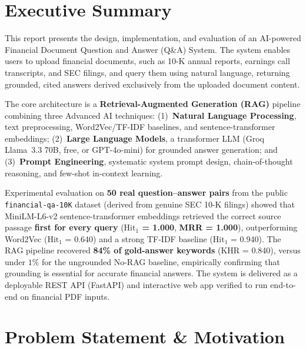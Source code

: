 \documentclass[12pt,a4paper]{article}
\begin{document}
\newpage
\tableofcontents
\newpage

\section{Executive Summary}

This report presents the design, implementation, and evaluation of an AI-powered Financial Document Question and Answer (Q\&A) System. The system enables users to upload financial documents, such as 10-K annual reports, earnings call transcripts, and SEC filings, and query them using natural language, returning grounded, cited answers derived exclusively from the uploaded document content.

The core architecture is a \textbf{Retrieval-Augmented Generation (RAG)} pipeline combining three Advanced AI techniques: (1)~\textbf{Natural Language Processing}, text preprocessing, Word2Vec/TF-IDF baselines, and sentence-transformer embeddings; (2)~\textbf{Large Language Models}, a transformer LLM (Groq Llama~3.3 70B, free, or GPT-4o-mini) for grounded answer generation; and (3)~\textbf{Prompt Engineering}, systematic system prompt design, chain-of-thought reasoning, and few-shot in-context learning.

Experimental evaluation on \textbf{50 real question--answer pairs} from the public \texttt{financial-qa-10K} dataset (derived from genuine SEC 10-K filings) showed that MiniLM-L6-v2 sentence-transformer embeddings retrieved the correct source passage \textbf{first for every query} (\textbf{$\text{Hit}_1$ = 1.000}, \textbf{MRR = 1.000}), outperforming Word2Vec ($\text{Hit}_1$ = 0.640) and a strong TF-IDF baseline ($\text{Hit}_1$ = 0.940). The RAG pipeline recovered \textbf{84\% of gold-answer keywords} (KHR = 0.840), versus under $1\%$ for the ungrounded No-RAG baseline, empirically confirming that grounding is essential for accurate financial answers. The system is delivered as a deployable REST API (FastAPI) and interactive web app verified to run end-to-end on financial PDF inputs.

\section{Problem Statement \& Motivation}
\end{document}
